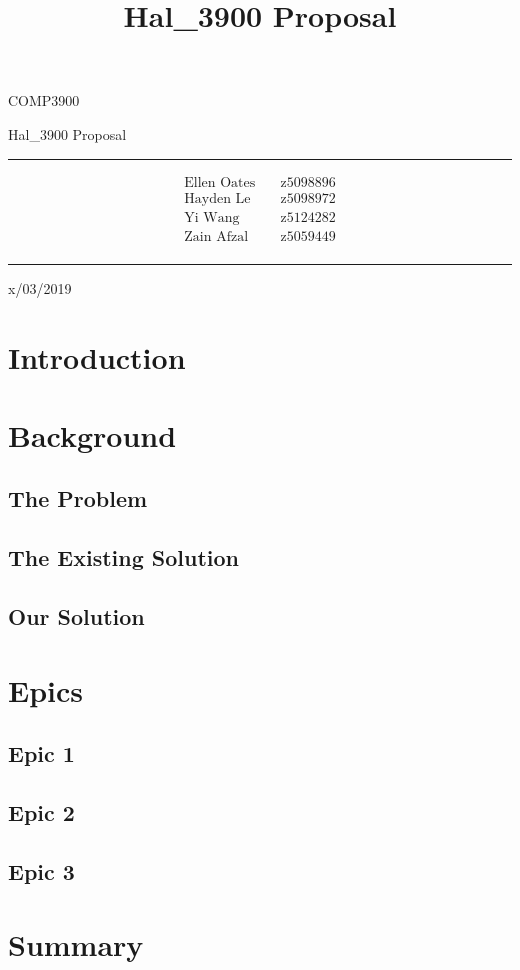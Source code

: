 \documentclass{article}
\title{Hal\_3900 Proposal}
\begin{document}
\begin{LARGE}
\begin{center}
\vspace*{15mm}

COMP3900

Hal\_3900 Proposal

\rule[4.5pt]{0.61\textwidth}{0.3pt}

\begin{align*}
  \text{Ellen Oates}    \quad   &\text{z5098896} \\
  \text{Hayden Le}      \quad   &\text{z5098972} \\
  \text{Yi Wang}        \quad   &\text{z5124282} \\
  \text{Zain Afzal}     \quad   &\text{z5059449} \\
\end{align*}

\rule[4.5pt]{0.61\textwidth}{0.3pt}

x/03/2019

\end{center}
\end{LARGE}
\newpage


\section{Introduction}


\section{Background}
\subsection{The Problem}


\subsection{The Existing Solution}


\subsection{Our Solution}


\section{Epics}
\subsection{Epic 1}


\subsection{Epic 2}


\subsection{Epic 3}


\section{Summary}
\end{document}
